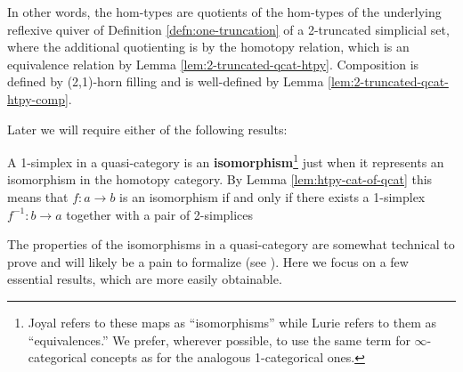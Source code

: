
In other words, the hom-types are quotients of the hom-types of the underlying reflexive quiver of Definition \ref{defn:one-truncation} of a 2-truncated simplicial set, where the additional quotienting is by the homotopy relation, which is an equivalence relation by Lemma \ref{lem:2-truncated-qcat-htpy}. Composition is defined by (2,1)-horn filling and is well-defined by Lemma \ref{lem:2-truncated-qcat-htpy-comp}.






Later we will require either of the following results:





   \begin{definition}\label{defn:isomorphism}
     A 1-simplex in a quasi-category is an \textbf{isomorphism}\footnote{Joyal refers to these maps as ``isomorphisms'' while Lurie refers to them as ``equivalences.'' We prefer, wherever possible, to use the same term for $\infty$-categorical concepts as for the analogous 1-categorical ones.} just when it represents an isomorphism in the homotopy category. By Lemma \ref{lem:htpy-cat-of-qcat} this means that $f \colon a \to b$ is an isomorphism if and only if there exists a 1-simplex $f^{-1} \colon b \to a$ together with a pair of 2-simplices
   \begin{center}
   \end{center}
   \end{definition}

   The properties of the isomorphisms in a quasi-category are somewhat technical to prove and will likely be a pain to formalize (see \cite[\S D]{RiehlVerity:2022eo}). Here we focus on a few essential results, which are more easily obtainable.

